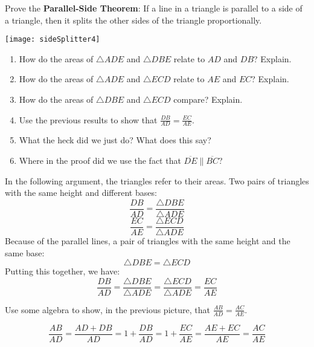 \documentclass[nooutcomes]{ximera}
\begin{document}
\begin{problem}
Prove the \textbf{Parallel-Side Theorem}:  If a line in a triangle is parallel to a side of a triangle, then it splits the other sides of the triangle proportionally. 
\begin{image}
\texttt{[image: sideSplitter4]}
\end{image}
\begin{enumerate}
\item How do the areas of $\triangle ADE$ and $\triangle DBE$ relate to $AD$ and $DB$?  Explain.  
\item How do the areas of $\triangle ADE$ and $\triangle ECD$ relate to $AE$ and $EC$?  Explain. 
\item How do the areas of $\triangle DBE$ and $\triangle ECD$ compare?  Explain.  
\item Use the previous results to show that $\frac{DB}{AD} = \frac{EC}{AE}$.  
\item What the heck did we just do?  What does this say?
\item Where in the proof did we use the fact that $\overline{DE} \parallel \overline{BC}$?  
\end{enumerate}
\end{problem}

\begin{teachingnote}
In the following argument, the triangles refer to their areas.  
Two pairs of triangles with the same height and different bases:  
\[
\frac{DB}{AD} = \frac{\triangle DBE}{\triangle ADE}
\]
\[
\frac{EC}{AE} = \frac{\triangle ECD}{\triangle ADE}
\]
Because of the parallel lines, a pair of triangles with the same height and the same base:  
\[
\triangle DBE = \triangle ECD
\]
Putting this together, we have:  
\[
\frac{DB}{AD} = \frac{\triangle DBE}{\triangle ADE} = \frac{\triangle ECD}{\triangle ADE}
=\frac{EC}{AE}
\]
\end{teachingnote}


\begin{problem}
Use some algebra to show, in the previous picture, that $\frac{AB}{AD} = \frac{AC}{AE}$.
\end{problem}

\begin{teachingnote}
\[
\frac{AB}{AD} = \frac{AD+DB}{AD} = 1 + \frac{DB}{AD} =  1 + \frac{EC}{AE} 
= \frac{AE + EC}{AE} = \frac{AC}{AE}
\]
\end{teachingnote}
\end{document}
